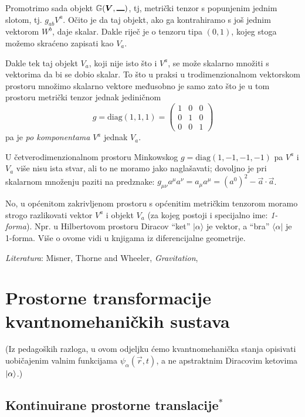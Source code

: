 Promotrimo sada objekt  $\bbtensor{G}(\vec{V},\slot)$, tj, metrički
tenzor s popunjenim jednim slotom, tj. $g_{ab}V^a$. Očito je da
taj objekt, ako ga kontrahiramo s još jednim vektorom $W^{b}$, daje skalar.
Dakle riječ je o tenzoru tipa $(0, 1)$, kojeg stoga možemo skraćeno
zapisati kao $V_a$.

Dakle tek taj objekt $V_a$, koji nije isto što i $V^a$, se može
skalarno množiti s vektorima da bi se dobio skalar. To što u praksi
u trodimenzionalnom vektorskom prostoru množimo skalarno vektore
međusobno je samo zato što je u tom prostoru metrički tenzor
jednak jediničnom 
\begin{displaymath}
g = \text{diag}(1, 1, 1) =
\begin{pmatrix}
1 & 0 & 0 \\ 0 & 1 & 0 \\ 0 & 0 & 1
\end{pmatrix}
\end{displaymath}
pa je \emph{po komponentama} $V^a$ jednak $V_a$.

U četverodimenzionalnom prostoru Minkowskog 
$g = \text{diag}(1, -1, -1, -1)$ pa $V^a$ i $V_a$ više nisu
ista stvar, ali to ne moramo jako naglašavati; dovoljno je
pri skalarnom množenju paziti na predznake:
$g_{\mu \nu} a^{\mu} a^{\nu} = a_{\mu} a^{\mu} = (a^{0})^2 
- \vec{a}\cdot\vec{a}$.

No, u općenitom zakrivljenom prostoru s općenitim metričkim
tenzorom moramo strogo razlikovati vektor $V^a$ i objekt
$V_a$ (za kojeg postoji i specijalno ime: \emph{1-forma}).
Npr. u Hilbertovom prostoru Diracov ``ket'' $|\alpha\rangle$ je
vektor, a ``bra'' $\langle\alpha|$ je 1-forma. Više o ovome
vidi u knjigama iz diferencijalne geometrije.



\emph{Literatura}: Misner, Thorne and Wheeler, \emph{Gravitation},

\section{Prostorne transformacije kvantnomehaničkih sustava}

(Iz pedagoških razloga, u ovom odjeljku ćemo kvantnomehanička stanja 
opisivati uobičajenim valnim funkcijama $\psi_{\alpha}(\vec{r},t)$, a ne
apstraktnim Diracovim ketovima $| \alpha \rangle$.)

\subsection{Kontinuirane prostorne translacije$^*$}

